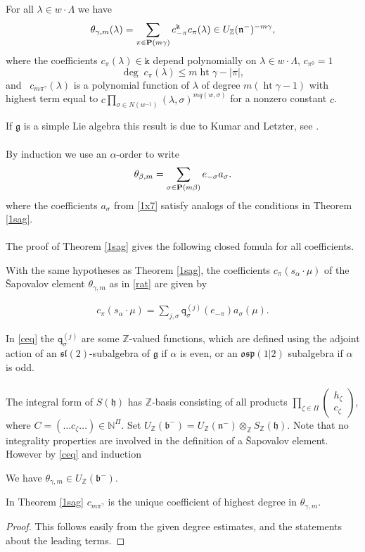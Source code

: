 \documentclass{article}
\def\q{{\mathtt q}}
\def\Z{{\mathbb Z}}
\def\N{{\mathbb N}}
\def\hgt{{\operatorname{ht}}}
\newcommand{\ttk}{\mathtt{k}}
\newcommand{\noi}{\noindent}
\newcommand{\ga}{\alpha}
\newcommand{\gb}{\beta}
\newcommand{\gc}{\gamma}
\newcommand{\gs}{\sigma}
\newcommand{\gz}{\zeta}
\newcommand{\gl}{\lambda}
\newcommand{\ot}{\otimes}
\newcommand{\fg}{\mathfrak{g}}\newcommand{\fgl}{\mathfrak{gl}}\newcommand{\so}{\mathfrak{so}}
\newcommand{\fsl}{\mathfrak{sl}}\newcommand{\fpsl}{\mathfrak{psl}}\newcommand{\osp}{\mathfrak{osp}}\newcommand{\spo}{\mathfrak{spo}}
\newcommand{\fb}{\mathfrak{b}}
\newcommand{\fn}{\mathfrak{n}}
\newcommand{\ey}{\end{eqnarray}}
\newcommand{\by}{\begin{eqnarray}}
\newcommand{\nn}{\nonumber}
\newcommand{\bpf}{\begin{proof}}
\newcommand{\epf}{\end{proof}}
\newcommand{\bt}{\begin{theorem}}
\newcommand{\et}{\end{theorem}}
\newcommand{\be}{\begin{equation}}
\newcommand{\bc}{\begin{corollary}}
\newcommand{\ee}{\end{equation}}
\newcommand{\ec}{\end{corollary}}
\begin{document}
\bt \label{1sag} For all
$\gl \in w\cdot  \Lambda$ we have
\begin{equation} %
\theta_{\gamma,m}(\gl) = \sum_{\pi \in {{\bf P}}(m\gamma)} e^\ttk_{-\pi}c_{ \pi}(\lambda) \in
U_\Z({\mathfrak n}^-)^{- m\gamma} ,\nn
\end{equation}
where 
the coefficients $c_{\pi}(\gl) \in \ttk $ depend polynomially on $\gl \in
w\cdot  \Lambda$, $c_{\pi^0} = 1$ 
\be \label{10a}
 \deg  \; c_{\pi}(\gl) \leq m\hgt \gc - |\pi|,\nn\ee
and \ $c_{m\pi^{\gamma}}(\gl)$ is a polynomial function of
$\gl$ of degree $m(\hgt \gc - 1)$ with highest term equal to $c\prod_{\gs
\in N(w^{-1})}(\gl,\gs)^{mq(w,\gs)}$ for a nonzero constant $c$.
\et %
\noi 
If $\fg$ is a simple Lie algebra this result is due to Kumar and Letzter, see \cite{KL}. \\ \\
By induction we use an $\ga$-order to  write  \begin{equation} \label{1x7} \theta_{\gb,m} =
\sum_{\gs \in {{\bf P}}(m\gb)} e_{-\gs}a_{\gs}.
\end{equation} 
where the coefficients $a_{\gs}$ from \eqref{1x7} satisfy analogs of the conditions  in Theorem \ref{1sag}.
\\ \\ 
The proof of Theorem \ref{1sag} gives  the following closed fomula for all coefficients.
\bt \label{cot} With the same hypotheses as Theorem \ref{1sag}, the coefficients $c_{ \pi}(s_\ga\cdot\mu)$  of the Šapovalov element $\theta_{\gamma,m}$ as in \eqref{rat} are given by

\by \label{ceq}  c_{ \pi}(s_\ga\cdot\mu) %
=\sum_{j,\gs} 
 \q^{(j)} _{\gs}( e_{- \pi})
a_{\gs}(\mu).
\ey
\et \noi
\noi In \eqref{ceq} the $\q^{(j)} _{\gs}$ are some $\Z$-valued functions, which are defined using the adjoint action of an $\fsl(2)$-subalgebra of $\fg$ if $\ga$ is even, or an $\osp(1|2)$ subalgebra if $\ga$ is odd.
\\ \\
The integral form of 
$S(\mathfrak{h}) $ \index{Integral forms!$S_\Z(\mathfrak{h})$}
has $\Z$-basis consisting of all products $\prod_{\gz\in \Pi} \left(\begin{array}{c} h_\gz \\ c_\gz \end{array}\right)$, where $C= (\ldots c_\gz \ldots) \in \N^{\Pi}.$ Set 
$U_\Z(\fb^-)= U_\Z(\fn^-)\ot_\Z S_\Z(\mathfrak{h}).$
Note that no integrality properties are involved in the definition of a  Šapovalov element.  However   by \eqref{ceq} and induction 
\bc We have  $\theta_{\gc,m} \in U_\Z(\fb^-)$.
\ec
\bc \label{lter} In Theorem \ref{1sag}  $c_{m\pi^{\gamma}}$ is the unique coefficient of highest degree in $\theta_{\gc,m}.$
\ec
\bpf This follows easily from the given degree estimates, and the statements about the leading terms.\epf
\end{document}
